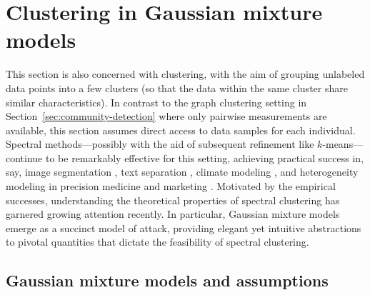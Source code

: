 \section{Clustering in Gaussian mixture models}
\label{sec:Gaussian-mixture}





This section is also concerned with clustering, with the aim of grouping unlabeled data points into a few clusters (so that the data within the same cluster share similar characteristics). 
In contrast to the graph clustering setting in Section~\ref{sec:community-detection} where only pairwise measurements are available, this section  assumes direct access to data samples for each individual. Spectral methods---possibly with the aid of subsequent refinement like $k$-means---continue to be remarkably effective  for this setting,  achieving practical success in, say, image segmentation \citep{shi2000normalized}, text separation \citep{reynolds1995robust}, climate modeling \citep{lin2017statistical}, and heterogeneity modeling in precision medicine and marketing \citep{fan2014challenges}. Motivated by the empirical successes, understanding the theoretical properties of spectral clustering has garnered growing attention recently. In particular, Gaussian mixture models emerge as a succinct model of attack,  providing elegant yet intuitive abstractions to pivotal quantities that dictate the feasibility of  spectral clustering.


%

\subsection{Gaussian mixture models and assumptions}
\label{sec:setup-gaussian-mixture}

